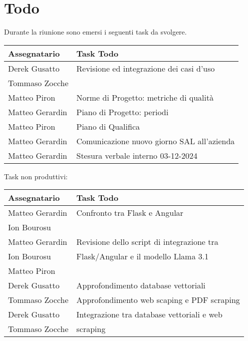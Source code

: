 \section{Todo}
Durante la riunione sono emersi i seguenti task da svolgere.

\begin{center}
  \begin{tabular}{|L{5cm}|L{8cm}|}
    \hline
    \textbf{Assegnatario} & \textbf{Task Todo} \\ \hline
    Derek Gusatto & Revisione ed integrazione dei casi d'uso \\
    Tommaso Zocche & \\ \hline
    Matteo Piron & Norme di Progetto: metriche di qualità \\ \hline
    Matteo Gerardin & Piano di Progetto: periodi \\ \hline
    Matteo Piron & Piano di Qualifica \\ \hline
    Matteo Gerardin & Comunicazione nuovo giorno SAL all'azienda \\ \hline
    Matteo Gerardin & Stesura verbale interno 03-12-2024 \\ \hline
  \end{tabular}
\end{center}

Task non produttivi:

\begin{center}
  \begin{tabular}{|L{5cm}|L{8cm}|}
    \hline
    \textbf{Assegnatario} & \textbf{Task Todo} \\ \hline
    Matteo Gerardin & Confronto tra Flask e Angular \\
    Ion Bourosu & \\ \hline
    Matteo Gerardin & Revisione dello script di integrazione tra \\
    Ion Bourosu & Flask/Angular e il modello Llama 3.1 \\ 
    Matteo Piron & \\ \hline
    Derek Gusatto & Approfondimento database vettoriali \\ \hline
    Tommaso Zocche & Approfondimento web scaping e PDF scraping \\ \hline
    Derek Gusatto & Integrazione tra database vettoriali e web  \\
    Tommaso Zocche & scraping \\ \hline
  \end{tabular}
\end{center}